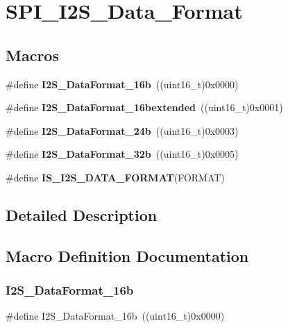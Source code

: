 \section{S\+P\+I\+\_\+\+I2\+S\+\_\+\+Data\+\_\+\+Format}
\label{group__SPI__I2S__Data__Format}
\subsection*{Macros}
\begin{DoxyCompactItemize}
\item 
\#define \textbf{ I2\+S\+\_\+\+Data\+Format\+\_\+16b}~((uint16\+\_\+t)0x0000)
\item 
\#define \textbf{ I2\+S\+\_\+\+Data\+Format\+\_\+16bextended}~((uint16\+\_\+t)0x0001)
\item 
\#define \textbf{ I2\+S\+\_\+\+Data\+Format\+\_\+24b}~((uint16\+\_\+t)0x0003)
\item 
\#define \textbf{ I2\+S\+\_\+\+Data\+Format\+\_\+32b}~((uint16\+\_\+t)0x0005)
\item 
\#define \textbf{ I\+S\+\_\+\+I2\+S\+\_\+\+D\+A\+T\+A\+\_\+\+F\+O\+R\+M\+AT}(F\+O\+R\+M\+AT)
\end{DoxyCompactItemize}


\subsection{Detailed Description}


\subsection{Macro Definition Documentation}
\mbox{\label{group__SPI__I2S__Data__Format_gabcd7cb799b68346a735709cc135bd414}} 
\subsubsection{I2\+S\+\_\+\+Data\+Format\+\_\+16b}
{\footnotesize\ttfamily \#define I2\+S\+\_\+\+Data\+Format\+\_\+16b~((uint16\+\_\+t)0x0000)}



